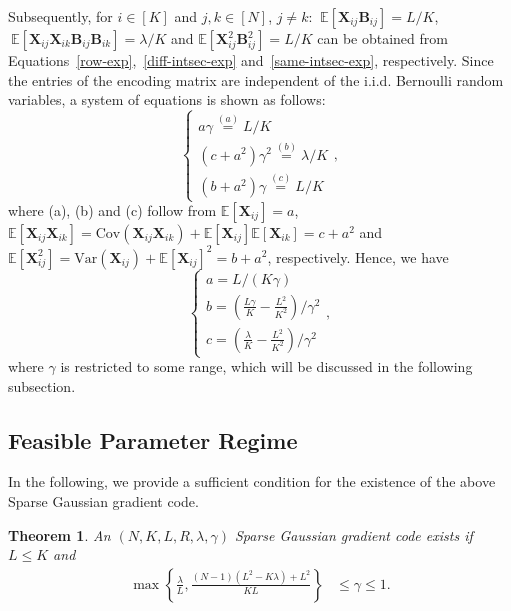 \documentclass[lettersize,journal]{IEEEtran}
\newcommand{\ex}[1]{\mathbb{E}\left[#1\right]}
\newtheorem{theorem}{Theorem}
\begin{document}
Subsequently, for $i\in [K]$ and $ j,k \in [N]  $, $j\not=k$: $~\ex{\boldsymbol{X}_{ij}\boldsymbol{B}_{ij}}=L/K$, $~\ex{\boldsymbol{X}_{ij}\boldsymbol{X}_{ik}\boldsymbol{B}_{ij}\boldsymbol{B}_{ik}}=\lambda/K$ and $\ex{\boldsymbol{X}_{ij}^2\boldsymbol{B}_{ij}^2} = L/K$ can be obtained from Equations~\eqref{row-exp},~\eqref{diff-intsec-exp} and~\eqref{same-intsec-exp}, respectively.
Since the entries of the encoding matrix are independent of the i.i.d. Bernoulli random variables, a system of equations is shown as follows:
\begin{equation}
\label{eq:sys-para-mid}
    \begin{cases}
        a\gamma \overset{(a)}{=} L/K\\
        (c+a^2) \gamma^2 \overset{(b)}{=} \lambda/K\\
        (b+a^2)\gamma \overset{(c)}{=} L/K
    \end{cases},
\end{equation}
where (a), (b) and (c) follow from $\ex{\boldsymbol{X}_{ij}} =a$, $\ex{\boldsymbol{X}_{ij}\boldsymbol{X}_{ik}} =\mathrm{Cov}(\boldsymbol{X}_{ij}\boldsymbol{X}_{ik})+ \ex{\boldsymbol{X}_{ij}}\ex{\boldsymbol{X}_{ik}} =c+a^2$ and $\ex{\boldsymbol{X}_{ij}^2} = \mathrm{Var}(\boldsymbol{X}_{ij}) + \ex{\boldsymbol{X}_{ij}}^2 = b + a^2$, respectively.
Hence, we have
\begin{equation}
\label{eq:sys-para}
    \begin{cases}
        a = L/(K\gamma)\\
        b = (\frac{L\gamma}{K} - \frac{L^2}{K^2})/\gamma^2\\
        c = (\frac{\lambda}{K} - \frac{L^2}{K^2})/\gamma^2
    \end{cases},
\end{equation}
where $\gamma$ is restricted to some range, which will be discussed in the following subsection.

\subsection{Feasible Parameter Regime}
In the following, we provide a sufficient condition for the existence of the above Sparse Gaussian gradient code.
\label{sec:existence}
\begin{theorem}
\label{thm:para-region}
    An $(N, K, L, R, \lambda, \gamma)$ Sparse Gaussian gradient code exists if $L \leq K$ and
    \begin{align*}
        \max\left\{\frac{\lambda}{L},  \frac{(N-1)(L^2-K\lambda) + L^2}{KL}\right\} &\leq \gamma \leq 1.
    \end{align*}
\end{theorem}
\end{document}
